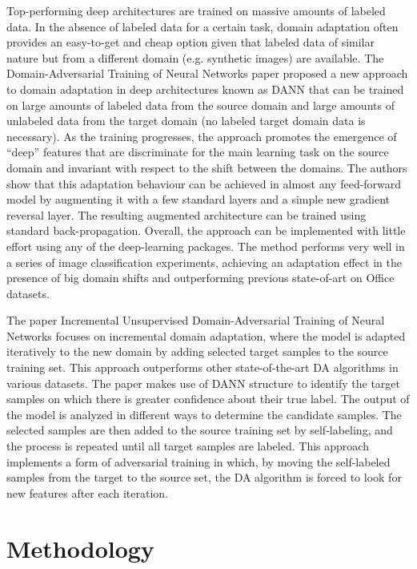 \documentclass[nonacm, sigconf]{acmart}
\begin{document}
\noindent Top-performing deep architectures are trained on massive amounts of labeled data. In the absence of labeled data for a certain task, domain adaptation often provides an easy-to-get and cheap option given that labeled data of similar nature but from a different domain (e.g. synthetic images) are available. The Domain-Adversarial Training of Neural Networks paper proposed a new approach to domain adaptation in deep architectures known as DANN that can be trained on large amounts of labeled data from the source domain and large amounts of unlabeled data from the target domain (no labeled target domain data is necessary). As the training progresses, the approach promotes the emergence of “deep” features that are discriminate for the main learning task on the source domain and invariant with respect to the shift between the domains. The authors show that this adaptation behaviour can be achieved in almost any feed-forward model by augmenting it with a few standard layers and a simple new gradient reversal layer. The resulting augmented architecture can be trained using standard back-propagation. Overall, the approach can be implemented with little effort using any of the deep-learning packages. The method performs very well in a series of image classification experiments, achieving an adaptation effect in the presence of big domain shifts and outperforming previous state-of-art on Office datasets. 

\noindent The paper Incremental Unsupervised Domain-Adversarial Training of Neural Networks\cite{19}  focuses on incremental domain adaptation, where the model is adapted iteratively to the new domain by adding selected target samples to the source training set. This approach outperforms other state-of-the-art DA algorithms in various datasets. The paper makes use of DANN structure to identify the target samples on which there is greater confidence about their true label. The output of the model is analyzed in different ways to determine the candidate samples. The selected samples are then added to the source training set by self-labeling, and the process is repeated until all target samples are labeled. This approach implements a form of adversarial training in which, by moving the self-labeled samples from the target to the source set, the DA algorithm is forced to look for new features after each iteration.
\noindent

\section{Methodology}
\end{document}
